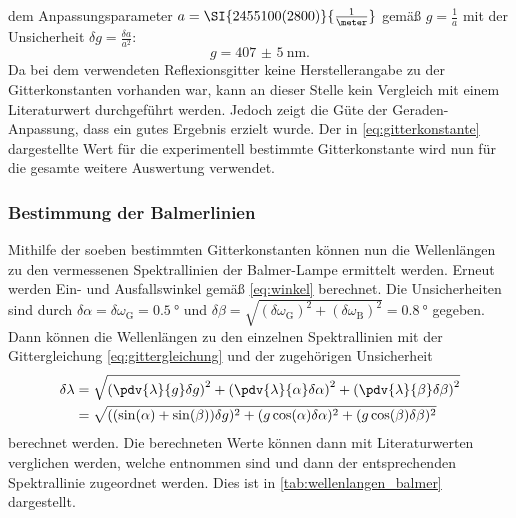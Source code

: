 dem Anpassungsparameter $a = \SI{2455100(2800)}{\frac{1}{\meter}}$ gemäß $g = \frac{1}{a}$ mit der Unsicherheit $\delta g = \frac{\delta a}{a^2}$:
\begin{equation}\label{eq:gitterkonstante}
    g = \SI{407(5)}{\nano \meter} .
\end{equation} Da bei dem verwendeten Reflexionsgitter keine Herstellerangabe zu der Gitterkonstanten vorhanden war, kann an dieser Stelle kein Vergleich mit einem
Literaturwert durchgeführt werden. Jedoch zeigt die Güte der Geraden-Anpassung, dass ein gutes Ergebnis erzielt wurde. Der in \ref{eq:gitterkonstante} dargestellte
Wert für die experimentell bestimmte Gitterkonstante wird nun für die gesamte weitere Auswertung verwendet.

\subsubsection{Bestimmung der Balmerlinien}\label{subsubsec:balmerlinien}
Mithilfe der soeben bestimmten Gitterkonstanten können nun die Wellenlängen zu den vermessenen Spektrallinien der Balmer-Lampe ermittelt werden. Erneut werden
Ein- und Ausfallswinkel gemäß \ref{eq:winkel} berechnet. Die Unsicherheiten sind durch $\delta \alpha = \delta \omega_{\mathrm{G}} = \SI{0,5}{\degree}$
und $\delta \beta = \sqrt{(\delta \omega_{\mathrm{G}})^2 + (\delta \omega_{\mathrm{B}})^2} = \SI{0,8}{\degree}$ gegeben. Dann können die Wellenlängen zu den einzelnen
Spektrallinien mit der Gittergleichung \ref{eq:gittergleichung} und der zugehörigen Unsicherheit
\begin{align*}
    \delta \lambda &= \sqrt{\left(\pdv{\lambda}{g} \delta g\right)^2 + \left(\pdv{\lambda}{\alpha} \delta \alpha\right)^2 + \left(\pdv{\lambda}{\beta} \delta \beta\right)^2} \\
    &= \sqrt{((\sin(\alpha) + \sin(\beta)) \delta g)^2 + (g \cos(\alpha) \delta \alpha)^2 + (g \cos(\beta) \delta \beta)^2}
\end{align*} berechnet werden. Die berechneten Werte können dann mit Literaturwerten verglichen werden, welche \cite{balmer_handblatt} entnommen sind und dann der entsprechenden
Spektrallinie zugeordnet werden. Dies ist in \cref{tab:wellenlangen_balmer} dargestellt.
